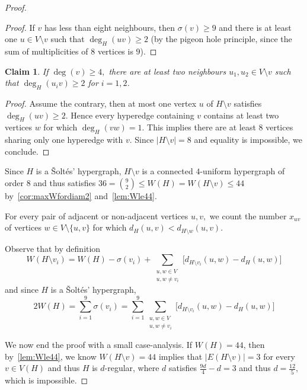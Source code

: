 \documentclass[a4paper,11pt]{article}
\newcommand*{\abs}[1]{\lvert #1\rvert}
\newtheorem{claim}[defi]{Claim}
\newcommand*{\myproofname}{Proof}
\newenvironment{claimproof}[1][\myproofname]{\begin{proof}[#1]\renewcommand*{\qedsymbol}{\(\diamondsuit\)}}{\end{proof}}
\begin{document}
\begin{proof}
\begin{claimproof}
        If $v$ has less than eight neighbours, then $\sigma(v)\ge 9$ and there is at least one $u \in V \setminus v$ such that $\deg_H(uv)\ge 2$ (by the pigeon hole principle, since the sum of multiplicities of $8$ vertices is $9$).     
    \end{claimproof}


    \begin{claim}\label{clm:claimdeg4}
        If $\deg(v)\ge 4,$ there are at least two neighbours $u_1,u_2 \in V \setminus v$ such that $\deg_H(u_iv)\ge 2$ for $i=1,2$.
    \end{claim}
    \begin{claimproof}
        Assume the contrary, then at most one vertex $u$ of $H \setminus v$ satisfies $\deg_H(uv)\ge 2$. Hence every hyperedge containing $v$ contains at least two vertices $w$ for which $\deg_H(vw)=1.$
        This implies there are at least $8$ vertices sharing only one hyperedge with $v$. Since $\abs{H \setminus v}=8$ and equality is impossible, we conclude.
    \end{claimproof}



Since $H$ is a \v Solt\'es' hypergraph, $H\setminus v$ is a connected $4$-uniform hypergraph of order $8$ and thus satisfies $36=\binom 92 \le W(H)=W(H\setminus v)\le44$ by~\cref{cor:maxWfordiam2} and~\cref{lem:Wle44}.

For every pair of adjacent or non-adjacent vertices $u,v,$ we count the number $x_{uv}$ of vertices $w \in V \setminus\{u,v\}$ for which $d_H(u,v)<d_{H \setminus w}(u,v).$

Observe that by definition
\begin{equation} \label{eq:wiener-index}
    W(H \setminus v_i) = W(H) - \sigma(v_i) + \sum_{\substack{u, w \in V \\ u, w \neq v_i}} \big[d_{H \setminus v_i}(u, w) - d_H(u, w)\big]
\end{equation}
and since $H$ is a \v Solt\'es' hypergraph,
\begin{equation} \label{eq:wiener-index2}
        2W(H)=\sum_{i=1}^{9}\sigma(v_i) = \sum_{i=1}^{9}\sum_{\substack{u, w \in V \\ u, w \neq v_i}} \big[d_{H \setminus v_i}(u, w) - d_H(u, w)\big]
\end{equation}

We now end the proof with a small case-analysis.
If $W(H)=44$, then by~\cref{lem:Wle44}, we know $W(H\setminus v)=44$ implies that $\abs{E(H\setminus v)}=3$ for every $v \in V(H)$ and thus $H$ is $d$-regular, where $d$ satisfies $\frac{9d}{4}-d=3$ and thus $d=\frac{12}{5},$ which is impossible.


\end{proof}
\end{document}
